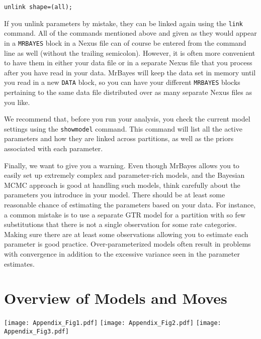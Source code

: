 \documentclass[12pt]{book}
\begin{document}
\begin{Verbatim}
unlink shape=(all);
\end{Verbatim}

If you unlink parameters by mistake, they can be linked again using the \texttt{link} command. All
of the commands mentioned above and given as they would appear in a \texttt{MRBAYES} block in a
Nexus file can of course be entered from the command line as well (without the trailing semicolon).
However, it is often more convenient to have them in either your data file or in a separate Nexus
file that you process after you have read in your data. MrBayes will keep the data set in memory
until you read in a new \texttt{DATA} block, so you can have your different \texttt{MRBAYES} blocks
pertaining to the same data file distributed over as many separate Nexus files as you like.

We recommend that, before you run your analysis, you check the current model settings using the
\texttt{showmodel} command. This command will list all the active parameters and how they are
linked across partitions, as well as the priors associated with each parameter.

Finally, we want to give you a warning. Even though MrBayes allows you to easily set up extremely
complex and parameter-rich models, and the Bayesian MCMC approach is good at handling such models,
think carefully about the parameters you introduce in your model. There should be at least some
reasonable chance of estimating the parameters based on your data. For instance, a common mistake
is to use a separate GTR model for a partition with so few substitutions that there is not a single
observation for some rate categories. Making sure there are at least some observations allowing you
to estimate each parameter is good practice. Over-parameterized models often result in problems
with convergence in addition to the excessive variance seen in the parameter estimates.

\appendix

\chapter{Overview of Models and Moves}\label{appendixOverview}

\hspace{-12mm}\texttt{[image: Appendix\_Fig1.pdf]}\newpage
\hspace{-8mm}\texttt{[image: Appendix\_Fig2.pdf]}
\texttt{[image: Appendix\_Fig3.pdf]}



\end{document}
